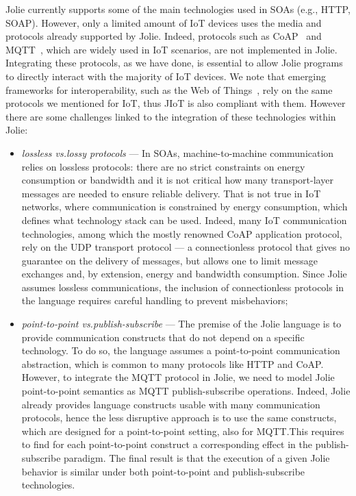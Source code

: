 Jolie currently supports some of the main technologies used in SOAs (e.g.,
HTTP, SOAP). However, only a limited amount of IoT devices uses the media and
protocols already supported by Jolie. Indeed, protocols such as
CoAP~\cite{doi:10.17487/RFC7252,coap} and MQTT~\cite{mqtt-v3.1.1,mqtt}, which
are widely used in IoT scenarios, are not implemented in Jolie. Integrating
these protocols, as we have done, is essential to allow Jolie programs to
directly interact with the majority of IoT devices. We note that emerging
frameworks for interoperability, such as the Web of Things~\cite{w3c17}, rely
on the same protocols we mentioned for IoT, thus JIoT is also compliant with
them.
%
However there are some
challenges linked to the integration of these technologies within Jolie:

\begin{itemize}
  \item \textit{lossless vs.\@ lossy protocols} --- In SOAs,
  machine-to-machine communication relies on lossless protocols: there are no
  strict constraints on energy consumption or bandwidth and it is not critical
  how many transport-layer messages are needed to ensure reliable delivery.
  That is not true in IoT networks, where communication is constrained by
  energy consumption, which defines what technology stack can be used. Indeed,
  many IoT communication technologies, among which the mostly renowned CoAP
  application protocol, rely on the UDP transport protocol --- a connectionless
  protocol that gives no guarantee on the delivery of messages, but allows one
  to limit message exchanges and, by extension, energy and bandwidth
  consumption. Since Jolie assumes lossless communications, the inclusion of
  connectionless protocols in the language requires careful handling to prevent
  misbehaviors;

  \item \textit{point-to-point vs.\@ publish-subscribe} --- The premise of the
  Jolie language is to provide communication constructs that do not depend on a
  specific technology. To do so, the language assumes a point-to-point
  communication abstraction, which is common to many protocols like HTTP and
  CoAP. However, to integrate the MQTT protocol in Jolie, we need to model Jolie
  point-to-point semantics as MQTT publish-subscribe operations. Indeed, Jolie
  already provides language constructs usable with many communication
  protocols, hence the less disruptive approach is to use the same constructs,
  which are designed for a point-to-point setting, also for MQTT.\@ This
  requires to find for each point-to-point construct a corresponding effect in
  the publish-subscribe paradigm. The final result is that the execution of a given Jolie behavior is similar under both point-to-point and publish-subscribe technologies.
  
\end{itemize} 
